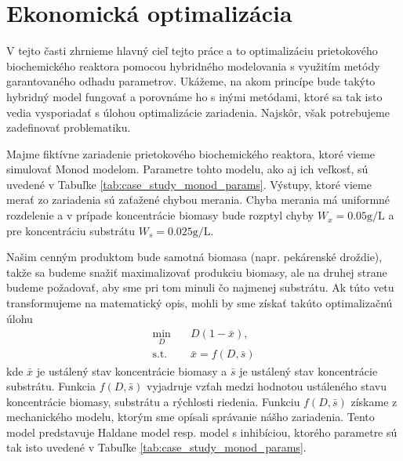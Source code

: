 \section{Ekonomická optimalizácia}
V tejto časti zhrnieme hlavný cieľ tejto práce a to optimalizáciu prietokového biochemického reaktora pomocou hybridného modelovania s využitím metódy garantovaného odhadu parametrov. Ukážeme, na akom princípe bude takýto hybridný model fungovať a porovnáme ho s inými metódami, ktoré sa tak isto vedia vysporiadať s úlohou optimalizácie zariadenia. Najskôr, však potrebujeme zadefinovať problematiku.

Majme fiktívne zariadenie prietokového biochemického reaktora, ktoré vieme simulovať Monod modelom. Parametre tohto modelu, ako aj ich veľkosť, sú uvedené v Tabuľke \ref{tab:case_study_monod_params}. Výstupy, ktoré vieme merať zo zariadenia sú zaťažené chybou merania. Chyba merania má uniformné rozdelenie a v prípade koncentrácie biomasy bude rozptyl chyby $ W_{x} = 0.05\si{\gram\per\liter} $ a pre koncentráciu substrátu $ W_{s} = 0.025\si{\gram\per\liter} $.

Našim cenným produktom bude samotná biomasa (napr. pekárenské droždie), takže sa budeme snažiť maximalizovať produkciu biomasy, ale na druhej strane budeme požadovať, aby sme pri tom minuli čo najmenej substrátu. Ak túto vetu transformujeme na matematický opis, mohli by sme získať takúto optimalizačnú úlohu
\begin{equation}
	\label{eq:chemostat_opt_general}
	\begin{split}
		\min_{D} &\quad D\left(1-\bar{x}\right), \\
		\text{s.t.} &\quad \bar{x} = f(D,\bar{s})
	\end{split}
\end{equation}
kde $ \bar{x} $ je ustálený stav koncentrácie biomasy a $ \bar{s} $ je ustálený stav koncentrácie substrátu. Funkcia $ f(D,\bar{s}) $ vyjadruje vzťah medzi hodnotou ustáleného stavu koncentrácie biomasy, substrátu a rýchlosti riedenia. Funkciu $ f(D,\bar{s}) $ získame z mechanického modelu, ktorým sme opísali správanie nášho zariadenia. Tento model predstavuje Haldane model resp. model s inhibíciou, ktorého parametre sú tak isto uvedené v Tabuľke \ref{tab:case_study_monod_params}. 

